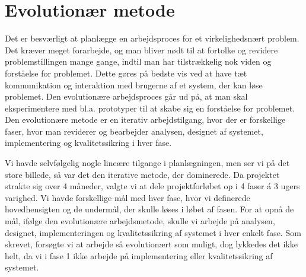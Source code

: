 \section{Evolutionær metode}
\label{sec:evolution}

Det er besværligt at planlægge en arbejdsproces for et virkelighedsnært problem. Det kræver meget forarbejde, og man bliver nødt til at fortolke og revidere problemstillingen mange gange, indtil man har tilstrækkelig nok viden og forståelse for problemet. Dette gøres på bedste vis ved at have tæt kommunikation og interaktion med brugerne af et system, der kan løse problemet. Den evolutionære arbejdsproces går ud på, at man skal eksperimentere med bl.a. prototyper til at skabe sig en forståelse for problemet. \cite{cic} Den evolutionære metode er en iterativ arbejdstilgang, hvor der er forskellige faser, hvor man reviderer og bearbejder analysen, designet af systemet, implementering og kvalitetssikring i hver fase.

Vi havde selvfølgelig nogle lineære tilgange i planlægningen, men ser vi på det store billede, så var det den iterative metode, der dominerede. Da projektet strakte sig over 4 måneder, valgte vi at dele projektforløbet op i 4 faser á 3 ugers varighed. Vi havde forskellige mål med hver fase, hvor vi definerede hovedhensigten og de undermål, der skulle løses i løbet af fasen. For at opnå de mål, ifølge den evolutionære arbejdsmetode, skulle vi arbejde på analysen, designet, implementeringen og kvalitetssikring af systemet i hver enkelt fase. Som skrevet, forsøgte vi at arbejde så evolutionært som muligt, dog lykkedes det ikke helt, da vi \fx i fase 1 ikke arbejde på implementering eller kvalitetssikring af systemet.



